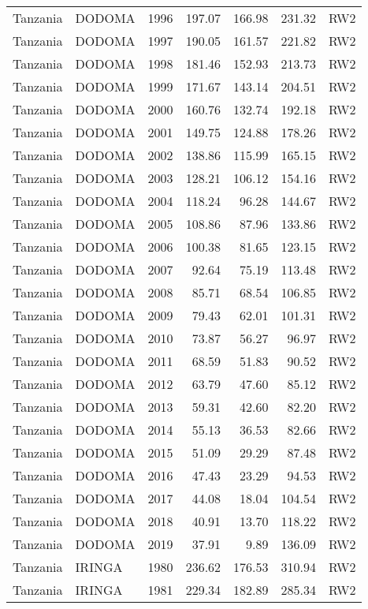 \begin{longtable}{lllrrrl}
  Tanzania & DODOMA & 1996 & 197.07 & 166.98 & 231.32 & RW2 \\ 
  Tanzania & DODOMA & 1997 & 190.05 & 161.57 & 221.82 & RW2 \\ 
  Tanzania & DODOMA & 1998 & 181.46 & 152.93 & 213.73 & RW2 \\ 
  Tanzania & DODOMA & 1999 & 171.67 & 143.14 & 204.51 & RW2 \\ 
  Tanzania & DODOMA & 2000 & 160.76 & 132.74 & 192.18 & RW2 \\ 
  Tanzania & DODOMA & 2001 & 149.75 & 124.88 & 178.26 & RW2 \\ 
  Tanzania & DODOMA & 2002 & 138.86 & 115.99 & 165.15 & RW2 \\ 
  Tanzania & DODOMA & 2003 & 128.21 & 106.12 & 154.16 & RW2 \\ 
  Tanzania & DODOMA & 2004 & 118.24 & 96.28 & 144.67 & RW2 \\ 
  Tanzania & DODOMA & 2005 & 108.86 & 87.96 & 133.86 & RW2 \\ 
  Tanzania & DODOMA & 2006 & 100.38 & 81.65 & 123.15 & RW2 \\ 
  Tanzania & DODOMA & 2007 & 92.64 & 75.19 & 113.48 & RW2 \\ 
  Tanzania & DODOMA & 2008 & 85.71 & 68.54 & 106.85 & RW2 \\ 
  Tanzania & DODOMA & 2009 & 79.43 & 62.01 & 101.31 & RW2 \\ 
  Tanzania & DODOMA & 2010 & 73.87 & 56.27 & 96.97 & RW2 \\ 
  Tanzania & DODOMA & 2011 & 68.59 & 51.83 & 90.52 & RW2 \\ 
  Tanzania & DODOMA & 2012 & 63.79 & 47.60 & 85.12 & RW2 \\ 
  Tanzania & DODOMA & 2013 & 59.31 & 42.60 & 82.20 & RW2 \\ 
  Tanzania & DODOMA & 2014 & 55.13 & 36.53 & 82.66 & RW2 \\ 
  Tanzania & DODOMA & 2015 & 51.09 & 29.29 & 87.48 & RW2 \\ 
  Tanzania & DODOMA & 2016 & 47.43 & 23.29 & 94.53 & RW2 \\ 
  Tanzania & DODOMA & 2017 & 44.08 & 18.04 & 104.54 & RW2 \\ 
  Tanzania & DODOMA & 2018 & 40.91 & 13.70 & 118.22 & RW2 \\ 
  Tanzania & DODOMA & 2019 & 37.91 & 9.89 & 136.09 & RW2 \\ 
  Tanzania & IRINGA & 1980 & 236.62 & 176.53 & 310.94 & RW2 \\ 
  Tanzania & IRINGA & 1981 & 229.34 & 182.89 & 285.34 & RW2 \\ 

\end{longtable}
